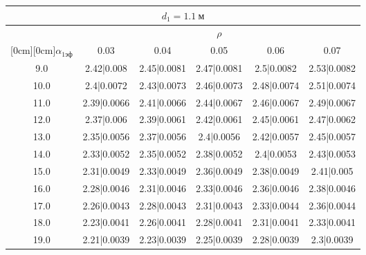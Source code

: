 \documentclass[20pt]{article}
\begin{document}
\begin{center}
\begin{tabular}{c|ccccc}
\hline
	\multicolumn{6}{c}{$d_{1}=1.1 \ м$} \\
\hline
	 & \multicolumn{5}{|c}{$\rho$} \\
	\cline{2-6}
	\raisebox{1.5ex}[0cm][0cm]{$\alpha_{1эф}$} & 0.03 & 0.04 & 0.05 & 0.06 & 0.07\\
\hline
	9.0 & 	2.42|0.008 & 	2.45|0.0081 & 	2.47|0.0081 & 	2.5|0.0082 & 	2.53|0.0082\\
	10.0 & 	2.4|0.0072 & 	2.43|0.0073 & 	2.46|0.0073 & 	2.48|0.0074 & 	2.51|0.0074\\
	11.0 & 	2.39|0.0066 & 	2.41|0.0066 & 	2.44|0.0067 & 	2.46|0.0067 & 	2.49|0.0067\\
	12.0 & 	2.37|0.006 & 	2.39|0.0061 & 	2.42|0.0061 & 	2.45|0.0061 & 	2.47|0.0062\\
	13.0 & 	2.35|0.0056 & 	2.37|0.0056 & 	2.4|0.0056 & 	2.42|0.0057 & 	2.45|0.0057\\
	14.0 & 	2.33|0.0052 & 	2.35|0.0052 & 	2.38|0.0052 & 	2.4|0.0053 & 	2.43|0.0053\\
	15.0 & 	2.31|0.0049 & 	2.33|0.0049 & 	2.36|0.0049 & 	2.38|0.0049 & 	2.41|0.005\\
	16.0 & 	2.28|0.0046 & 	2.31|0.0046 & 	2.33|0.0046 & 	2.36|0.0046 & 	2.38|0.0046\\
	17.0 & 	2.26|0.0043 & 	2.28|0.0043 & 	2.31|0.0043 & 	2.33|0.0044 & 	2.36|0.0044\\
	18.0 & 	2.23|0.0041 & 	2.26|0.0041 & 	2.28|0.0041 & 	2.31|0.0041 & 	2.33|0.0041\\
	19.0 & 	2.21|0.0039 & 	2.23|0.0039 & 	2.25|0.0039 & 	2.28|0.0039 & 	2.3|0.0039\\
\end{tabular}


\end{center}
\end{document}

